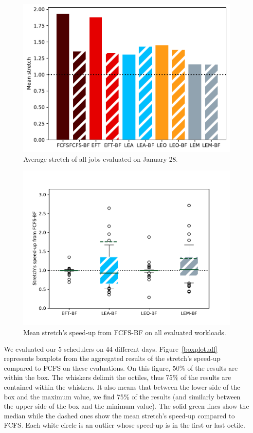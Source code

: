 \documentclass[conference,10pt]{IEEEtran}
\begin{document}
\begin{figure}[tb]\centering\includegraphics[scale=0.41]{../MBSS/plot/BF_AND_NON_BF_Results_FCFS_Score_Backfill_2022-01-28->2022-01-28_V10000_Mean_Stretch_450_128_32_256_4_1024.pdf}\caption{Average stretch of all jobs evaluated on January 28.}\label{stretch.01-28}\end{figure}
\begin{figure}\centering\includegraphics[scale=0.41]{../MBSS/plot/Boxplot/box_plot_mean_stretch_all_workloads_bf.pdf}\caption{Mean stretch's speed-up from FCFS-BF on all evaluated workloads.}\label{boxplot.all_bf}\end{figure}

We evaluated our 5 schedulers on 44 different days.
Figure~\ref{boxplot.all} represents boxplots from the aggregated
results of the stretch's speed-up compared to FCFS on these evaluations.
On this figure, 50\% of the results are within the box.
The whiskers delimit the octiles, thus 75\% of the results are contained
within the whiskers. It also means that between the lower side of the box and the maximum value,
we find 75\% of the results (and similarly between the upper side of the box and the minimum value).
The solid green lines show the median while the dashed ones show the mean stretch's speed-up compared to FCFS. 
Each white circle is an outlier whose speed-up is in the first or last octile.
\end{document}
